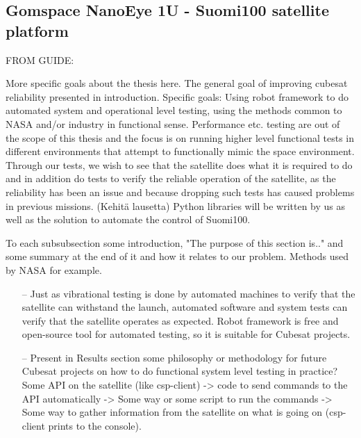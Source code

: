 \documentclass[english,12pt,a4paper,pdftex,elec,utf8]{aaltothesis}
\begin{document}
\subsection{Gomspace NanoEye 1U - Suomi100 satellite platform}
FROM GUIDE:\par 
More specific goals about the thesis here. The general goal of improving cubesat reliability presented in introduction. Specific goals: Using robot framework to do automated system and operational level testing, using the methods common to NASA and/or industry in functional sense. Performance etc. testing are out of the scope of this thesis and the focus is on running higher level functional tests in different environments that attempt to functionally mimic the space environment. Through our tests, we wish to see that the satellite does what it is required to do and in addition do tests to verify the reliable operation of the satellite, as the reliability has been an issue and because dropping such tests has caused problems in previous missions. (Kehitä lausetta) Python libraries will be written by us as well as the solution to automate the control of Suomi100.\par
To each subsubsection some introduction, "The purpose of this section is.." and some summary at the end of it and how it relates to our problem. Methods used by NASA for example.
\begin{itemize}
\item[--]Just as vibrational testing is done by automated machines to verify that the satellite can withstand the launch, automated software and system tests can verify that the satellite operates as expected. Robot framework is free and open-source tool for automated testing, so it is suitable for Cubesat projects.
\item[--]Present in Results section some philosophy or methodology for future Cubesat projects on how to do functional system level testing in practice? Some API on the satellite (like csp-client) -> code to send commands to the API automatically -> Some way or some script to run the commands -> Some way to gather information from the satellite on what is going on (csp-client prints to the console).
\end{itemize}
\end{document}
